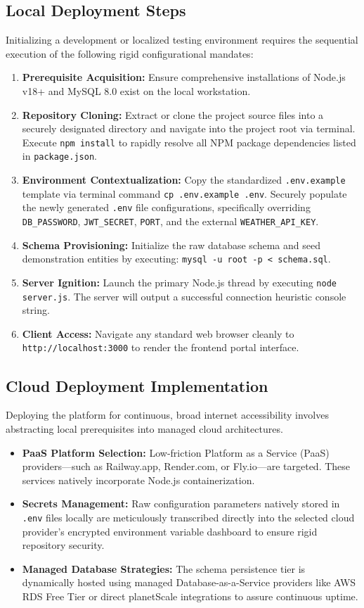 \subsection{Local Deployment Steps}
Initializing a development or localized testing environment requires the sequential execution of the following rigid configurational mandates:
\begin{enumerate}
    \item \textbf{Prerequisite Acquisition:} Ensure comprehensive installations of Node.js v18+ and MySQL 8.0 exist on the local workstation.
    \item \textbf{Repository Cloning:} Extract or clone the project source files into a securely designated directory and navigate into the project root via terminal. Execute \texttt{npm install} to rapidly resolve all NPM package dependencies listed in \texttt{package.json}.
    \item \textbf{Environment Contextualization:} Copy the standardized \texttt{.env.example} template via terminal command \texttt{cp .env.example .env}. Securely populate the newly generated \texttt{.env} file configurations, specifically overriding \texttt{DB\_PASSWORD}, \texttt{JWT\_SECRET}, \texttt{PORT}, and the external \texttt{WEATHER\_API\_KEY}.
    \item \textbf{Schema Provisioning:} Initialize the raw database schema and seed demonstration entities by executing: \texttt{mysql -u root -p < schema.sql}.
    \item \textbf{Server Ignition:} Launch the primary Node.js thread by executing \texttt{node server.js}. The server will output a successful connection heuristic console string.
    \item \textbf{Client Access:} Navigate any standard web browser cleanly to \texttt{http://localhost:3000} to render the frontend portal interface.
\end{enumerate}

\subsection{Cloud Deployment Implementation}
Deploying the platform for continuous, broad internet accessibility involves abstracting local prerequisites into managed cloud architectures.
\begin{itemize}
    \item \textbf{PaaS Platform Selection:} Low-friction Platform as a Service (PaaS) providers—such as Railway.app, Render.com, or Fly.io—are targeted. These services natively incorporate Node.js containerization.
    \item \textbf{Secrets Management:} Raw configuration parameters natively stored in \texttt{.env} files locally are meticulously transcribed directly into the selected cloud provider's encrypted environment variable dashboard to ensure rigid repository security.
    \item \textbf{Managed Database Strategies:} The schema persistence tier is dynamically hosted using managed Database-as-a-Service providers like AWS RDS Free Tier or direct planetScale integrations to assure continuous uptime.
\end{itemize}

